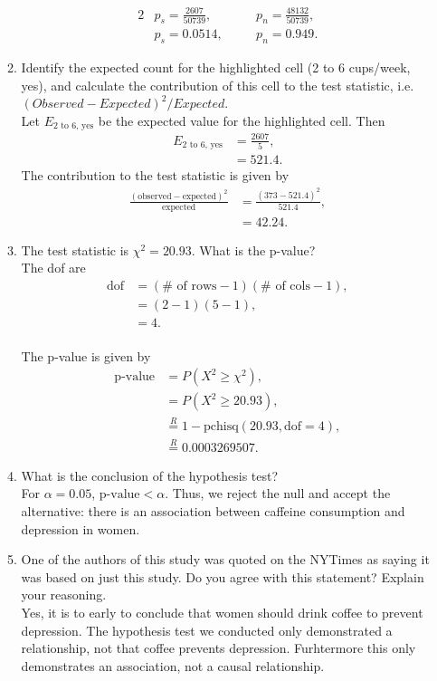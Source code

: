 \documentclass[a4paper, 12pt]{../../config/homework}
\begin{document}
\begin{enumerate}
\begin{enumerate}[label=(\alph*)]
\begin{alignat*}{2}
&p_s= \frac{2607}{50739}, \quad &&p_n = \frac{48132}{50739},\\
&p_s= 0.0514, \quad &&p_n= 0.949.
\end{alignat*}
\item Identify the expected count for the highlighted cell (2 to 6 cups/week, yes), and calculate the contribution of this cell to the test statistic, i.e. \((\textit{Observed} - \textit{Expected})^2 / \textit{Expected}\).
\\Let \(E_{\text{2 to 6, yes}}\) be the expected value for the highlighted cell.
Then
\begin{align*}
E_{\text{2 to 6, yes}} &= \frac{2607}{5},\\
&= 521.4.
\end{align*}
The contribution to the test statistic is given by
\begin{align*}
\frac{(\text{observed} - \text{expected})^2}{\text{expected}} &= \frac{(373 - 521.4)^2}{521.4},\\
&= 42.24.
\end{align*}
\item The test statistic is \(\chi^2 = 20.93\). What is the p-value?
\\The dof are
\begin{align*}
\text{dof} &= (\#\text{ of rows} - 1)(\#\text{ of cols} - 1),\\
&= (2-1)(5-1),\\
&= 4.
\end{align*}
\\The p-value is given by
\begin{align*}
\text{p-value} &= P(X^2 \ge \chi^2),\\
&= P(X^2 \ge 20.93),\\
&\overset{R}{=} 1 - \text{pchisq}(20.93, \text{dof}=4),\\
&\overset{R}{=} 0.0003269507.
\end{align*}
\item What is the conclusion of the hypothesis test?
\\For \(\alpha=0.05\), \(\text{p-value} < \alpha \). Thus, we reject the null and accept the alternative: there is an association between caffeine consumption and depression in women.
\item One of the authors of this study was quoted on the NYTimes as saying it was  based on just this study. Do you agree with this statement? Explain your reasoning.
\\Yes, it is to early to conclude that women should drink coffee to prevent depression. The hypothesis test we conducted only demonstrated a relationship, not that coffee prevents depression. Furhtermore this only demonstrates an association, not a causal relationship.
\end{enumerate}


\end{enumerate}
\end{document}
